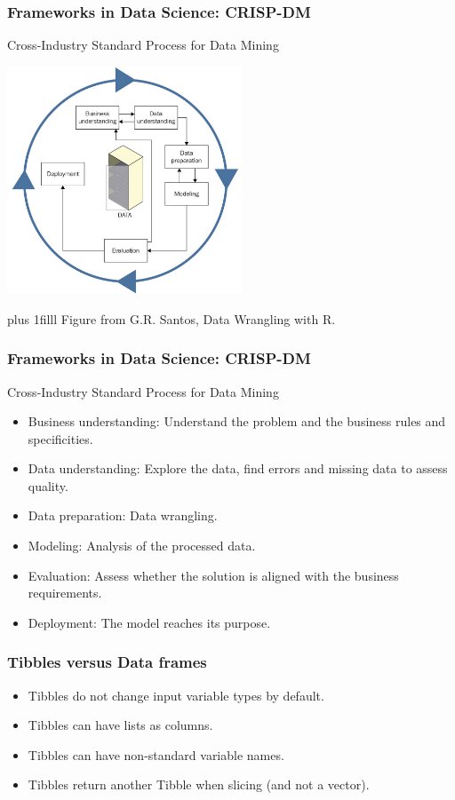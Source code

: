 \documentclass{beamer}
\newcommand{\btVFill}{\vskip0pt plus 1filll}
\begin{document}
	\begin{frame}
		\frametitle{Frameworks in Data Science: CRISP-DM}

		Cross-Industry Standard Process for Data Mining

		\begin{center}
		\includegraphics[width=7cm]{figures/Santos_1_8.png}
		\end{center}

		\btVFill
		\tiny{Figure from G.R. Santos, Data Wrangling with R.}

	\end{frame}

	\begin{frame}
		\frametitle{Frameworks in Data Science: CRISP-DM}

		Cross-Industry Standard Process for Data Mining

		\vspace{2em}

		\begin{itemize}
			\item Business understanding: Understand the problem and the business rules and specificities.
			\item Data understanding: Explore the data, find errors and missing data to assess quality.
			\item Data preparation: Data wrangling.
			\item Modeling: Analysis of the processed data.
			\item Evaluation: Assess whether the solution is aligned with the business requirements.
			\item Deployment: The model reaches its purpose.
		\end{itemize}

	\end{frame}
		
	\begin{frame}
		\frametitle{Tibbles versus Data frames}

		\begin{itemize}
		\setlength{\itemsep}{1em}
			\item Tibbles do not change input variable types by default.
			\item Tibbles can have lists as columns.
			\item Tibbles can have non-standard variable names.
			\item Tibbles return another Tibble when slicing (and not a vector).
		\end{itemize}

	\end{frame}
\end{document}
